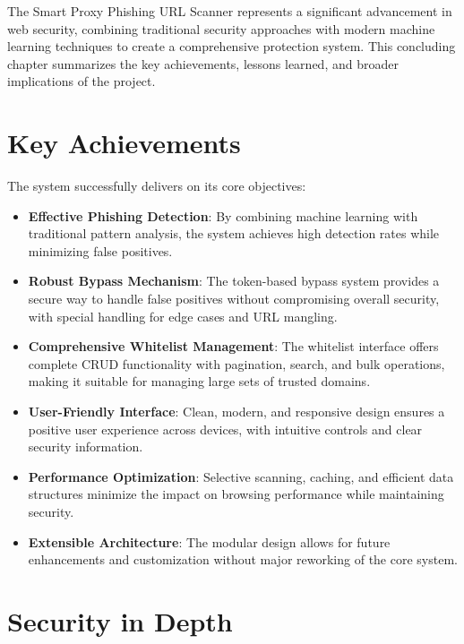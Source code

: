 The Smart Proxy Phishing URL Scanner represents a significant advancement in web security, combining traditional security approaches with modern machine learning techniques to create a comprehensive protection system. This concluding chapter summarizes the key achievements, lessons learned, and broader implications of the project.

\section{Key Achievements}

The system successfully delivers on its core objectives:

\begin{itemize}
    \item \textbf{Effective Phishing Detection}: By combining machine learning with traditional pattern analysis, the system achieves high detection rates while minimizing false positives.
    
    \item \textbf{Robust Bypass Mechanism}: The token-based bypass system provides a secure way to handle false positives without compromising overall security, with special handling for edge cases and URL mangling.
    
    \item \textbf{Comprehensive Whitelist Management}: The whitelist interface offers complete CRUD functionality with pagination, search, and bulk operations, making it suitable for managing large sets of trusted domains.
    
    \item \textbf{User-Friendly Interface}: Clean, modern, and responsive design ensures a positive user experience across devices, with intuitive controls and clear security information.
    
    \item \textbf{Performance Optimization}: Selective scanning, caching, and efficient data structures minimize the impact on browsing performance while maintaining security.
    
    \item \textbf{Extensible Architecture}: The modular design allows for future enhancements and customization without major reworking of the core system.
\end{itemize}

\section{Security in Depth}

